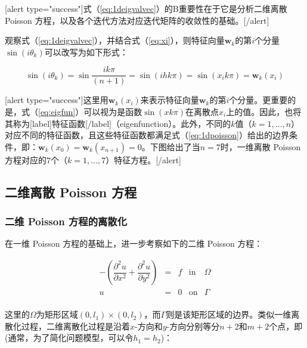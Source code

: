 \documentclass[12pt, UTF8, nofonts]{ctexart}
\begin{document}
[alert type="success"]式（\ref{eq:1deigvalvec}）的B重要性在于它是分析二维离散 Poisson 方程，以及各个迭代方法对应迭代矩阵的收敛性的基础。[/alert]

观察式（\ref{eq:1deigvalvec}），并结合式（\ref{eq:xi}），则特征向量$\boldsymbol{w}_k$的第$i$个分量$\sin(i\theta_k)$可以改写为如下形式：

\begin{equation}
  \label{eq:eigfun}
  \sin(i\theta_k) = \sin\dfrac{ik\pi}{(n+1)} = \sin(ihk\pi) = \sin(x_ik\pi) = \boldsymbol{w}_{k}(x_i)
\end{equation}

[alert type="success"]这里用$\boldsymbol{w}_k(x_i)$来表示特征向量$\boldsymbol{w}_k$的第$i$个分量。更重要的是，式（\ref{eq:eigfun}）可以视为是函数$\sin(xk\pi)$在离散点$x_i$上的值。因此，也将其称为[label]特征函数[/label]（eigenfunction）。此外，不同的$k$值（$k=1,\ldots,n$）对应不同的特征函数，且这些特征函数都满足式（\ref{eq:1dpoisson}）给出的边界条件，即：$\boldsymbol{w}_k(x_0)=\boldsymbol{w}_k(x_{n+1})=0$。下图给出了当$n=7$时，一维离散 Poisson 方程对应的$7$个（$k=1,\ldots,7$）特征方程。[/alert]



\subsection*{二维离散 Poisson 方程}

\subsubsection*{二维 Poisson 方程的离散化}

在一维 Poisson 方程的基础上，进一步考察如下的二维 Poisson 方程：

\begin{equation}
  \label{eq:2dpoisson}
  \begin{array}{rcccc}
    -\left(\dfrac{\partial^2u}{\partial x^2} + \dfrac{\partial^2u}{\partial y^2}\right) & = & f & \mathrm{in} & \Omega \\
    u & = & 0 & \mathrm{on} & \Gamma \\
  \end{array}
\end{equation}

这里的$\Omega$为矩形区域$(0,l_1)\times(0,l_2)$，而$\Gamma$则是该矩形区域的边界。类似一维离散化过程，二维离散化过程是沿着$x$-方向和$y$-方向分别等分$n+2$和$m+2$个点，即(通常，为了简化问题模型，可以令$h_1=h_2$)：
\end{document}
